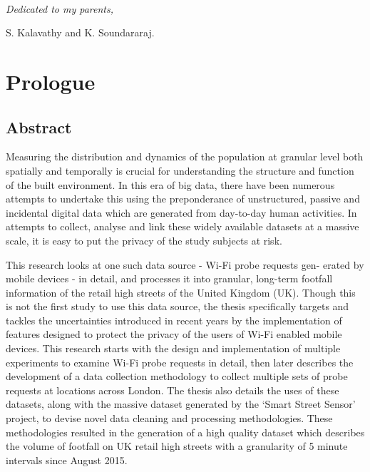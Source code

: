
\cleardoublepage
~\vfill
\begin{doublespace}
\noindent\fontsize{12}{12}\selectfont\itshape \nohyphenation
\hspace{4cm}Dedicated to my parents,

\hspace{3.5cm}S. Kalavathy and K. Soundararaj.
\end{doublespace}
\vfill
\vfill

\chapter*{Prologue}

\section*{Abstract} 

Measuring the distribution and dynamics of the population at granular level both spatially and temporally is crucial for understanding the structure and function of the built environment.
In this era of big data, there have been numerous attempts to undertake this using the preponderance of unstructured, passive and incidental digital data which are generated from day-to-day human activities.
In attempts to collect, analyse and link these widely available datasets at a massive scale, it is easy to put the privacy of the study subjects at risk.

This research looks at one such data source - Wi-Fi probe requests gen- erated by mobile devices - in detail, and processes it into granular, long-term footfall information of the retail high streets of the United Kingdom (UK).
Though this is not the first study to use this data source, the thesis specifically targets and tackles the uncertainties introduced in recent years by the implementation of features designed to protect the privacy of the users of Wi-Fi enabled mobile devices.
This research starts with the design and implementation of multiple experiments to examine Wi-Fi probe requests in detail, then later describes the development of a data collection methodology to collect multiple sets of probe requests at locations across London.
The thesis also details the uses of these datasets, along with the massive dataset generated by the `Smart Street Sensor' project, to devise novel data cleaning and processing methodologies.
These methodologies resulted in the generation of a high quality dataset which describes the volume of footfall on UK retail high streets with a granularity of 5 minute intervals since August 2015.

